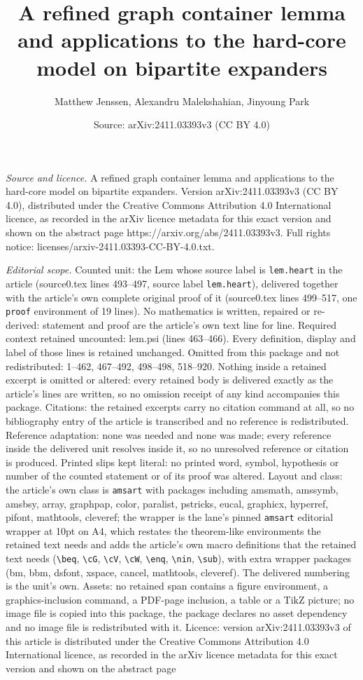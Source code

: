 \documentclass[10pt,a4paper]{amsart}
\title[A refined graph container lemma and applications to the hard]{A refined graph container lemma and applications to the hard-core model on bipartite expanders}
\author{Matthew Jenssen, Alexandru Malekshahian, Jinyoung Park}
\date{Source: arXiv:2411.03393v3 (CC BY 4.0)}
\begin{document}
\maketitle

\noindent\emph{Source and licence.} A refined graph container lemma and applications to the hard-core model on bipartite expanders. Version arXiv:2411.03393v3 (CC BY 4.0), distributed under the Creative Commons Attribution 4.0 International licence, as recorded in the arXiv licence metadata for this exact version and shown on the abstract page https://arxiv.org/abs/2411.03393v3. Full rights notice: licenses/arxiv-2411.03393-CC-BY-4.0.txt.\par\smallskip

\noindent\textit{Editorial scope.} Counted unit: the Lem whose source label is \texttt{lem.heart} in the article (source0.tex lines 493--497, source label \texttt{lem.heart}), delivered together with the article's own complete original proof of it (source0.tex lines 499--517, one \texttt{proof} environment of 19 lines). No mathematics is written, repaired or re-derived: statement and proof are the article's own text line for line. Required context retained uncounted: lem.psi (lines 463--466). Every definition, display and label of those lines is retained unchanged. Omitted from this package and not redistributed: 1--462, 467--492, 498--498, 518--920. Nothing inside a retained excerpt is omitted or altered: every retained body is delivered exactly as the article's lines are written, so no omission receipt of any kind accompanies this package. Citations: the retained excerpts carry no citation command at all, so no bibliography entry of the article is transcribed and no reference is redistributed. Reference adaptation: none was needed and none was made; every reference inside the delivered unit resolves inside it, so no unresolved reference or citation is produced. Printed slips kept literal: no printed word, symbol, hypothesis or number of the counted statement or of its proof was altered. Layout and class: the article's own class is \texttt{amsart} with packages including amsmath, amssymb, amsbsy, array, graphpap, color, paralist, pstricks, eucal, graphicx, hyperref, pifont, mathtools, cleveref; the wrapper is the lane's pinned \texttt{amsart} editorial wrapper at 10pt on A4, which restates the theorem-like environments the retained text needs and adds the article's own macro definitions that the retained text needs (\texttt{\textbackslash beq}, \texttt{\textbackslash cG}, \texttt{\textbackslash cV}, \texttt{\textbackslash cW}, \texttt{\textbackslash enq}, \texttt{\textbackslash nin}, \texttt{\textbackslash sub}), with extra wrapper packages (bm, bbm, dsfont, xspace, cancel, mathtools, cleveref). The delivered numbering is the unit's own. Assets: no retained span contains a figure environment, a graphics-inclusion command, a PDF-page inclusion, a table or a TikZ picture; no image file is copied into this package, the package declares no asset dependency and no image file is redistributed with it. Licence: version arXiv:2411.03393v3 of this article is distributed under the Creative Commons Attribution 4.0 International licence, as recorded in the arXiv licence metadata for this exact version and shown on the abstract page 
\end{document}
